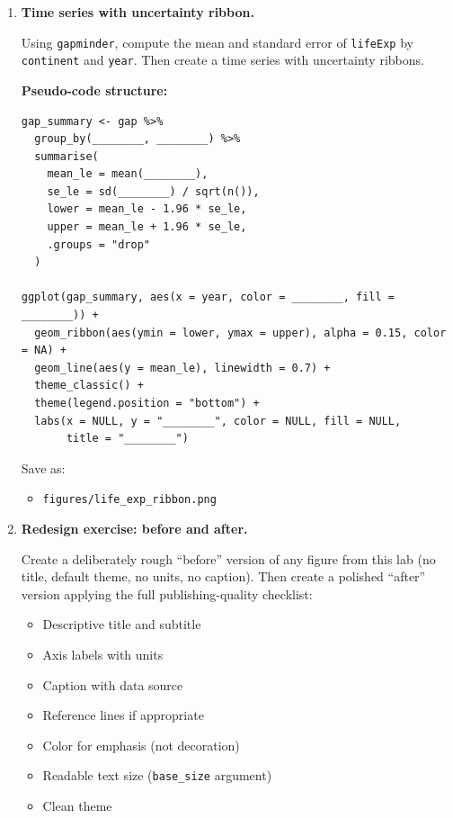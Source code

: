 \documentclass[11pt]{article}
\begin{document}
\begin{enumerate}
\textbf{Pseudo-code structure:}

\begin{verbatim}
df_survey$country <- reorder(df_survey$country, df_survey$dem_support)

ggplot(df_survey, aes(x = ________, y = ________)) +
  geom_vline(xintercept = 50, linetype = "dashed") +
  geom_errorbarh(aes(xmin = ________, xmax = ________),
                 height = 0.25) +
  geom_point(size = 3) +
  theme_classic() +
  labs(x = "________", y = NULL, title = "________")
\end{verbatim}

Save as:
\begin{itemize}
  \item \texttt{figures/democracy\_support\_ci.png}
\end{itemize}

\item \textbf{Time series with uncertainty ribbon.}

Using \texttt{gapminder}, compute the mean and standard error of \texttt{lifeExp} by \texttt{continent} and \texttt{year}. Then create a time series with uncertainty ribbons.

\textbf{Pseudo-code structure:}

\begin{verbatim}
gap_summary <- gap %>%
  group_by(________, ________) %>%
  summarise(
    mean_le = mean(________),
    se_le = sd(________) / sqrt(n()),
    lower = mean_le - 1.96 * se_le,
    upper = mean_le + 1.96 * se_le,
    .groups = "drop"
  )

ggplot(gap_summary, aes(x = year, color = ________, fill = ________)) +
  geom_ribbon(aes(ymin = lower, ymax = upper), alpha = 0.15, color = NA) +
  geom_line(aes(y = mean_le), linewidth = 0.7) +
  theme_classic() +
  theme(legend.position = "bottom") +
  labs(x = NULL, y = "________", color = NULL, fill = NULL,
       title = "________")
\end{verbatim}

Save as:
\begin{itemize}
  \item \texttt{figures/life\_exp\_ribbon.png}
\end{itemize}

\item \textbf{Redesign exercise: before and after.}

Create a deliberately rough ``before'' version of any figure from this lab (no title, default theme, no units, no caption). Then create a polished ``after'' version applying the full publishing-quality checklist:
\begin{itemize}
  \item Descriptive title and subtitle
  \item Axis labels with units
  \item Caption with data source
  \item Reference lines if appropriate
  \item Color for emphasis (not decoration)
  \item Readable text size (\texttt{base\_size} argument)
  \item Clean theme
\end{itemize}


\end{enumerate}
\end{document}
